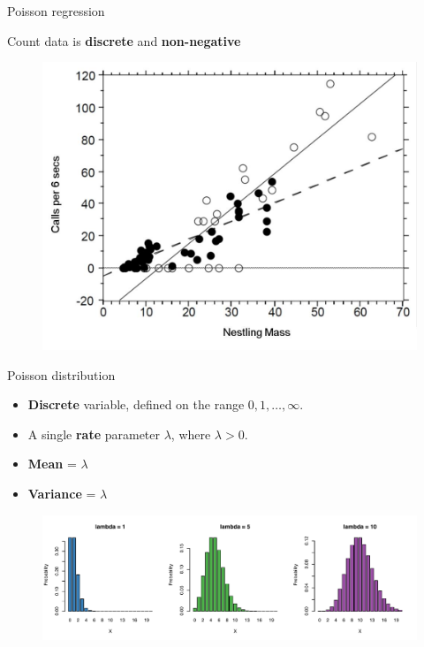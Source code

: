 \documentclass[pdf,handout]{beamer}
\begin{document}
\begin{frame}{Poisson regression}

Count data is \textbf{discrete} and \textbf{non-negative}

\begin{figure}
\includegraphics[width=.5\textwidth]{cuckooanalysis.png}
\end{figure}

\vspace{-.5cm}


\end{frame}

\begin{frame}{Poisson distribution}

\begin{itemize}\addtolength{\itemsep}{.5\baselineskip}
    \item \textbf{Discrete} variable, defined on the range $0, 1, \dots, \infty$.
    \item  A single \textbf{rate} parameter $\lambda$, where $\lambda > 0$.
    \item \textbf{Mean} = $\lambda$  
    \item \textbf{Variance} = $\lambda$
\end{itemize}

\begin{figure}
\includegraphics[width=.75\textwidth]{poissondist.pdf}
\end{figure}

\end{frame}
\end{document}
